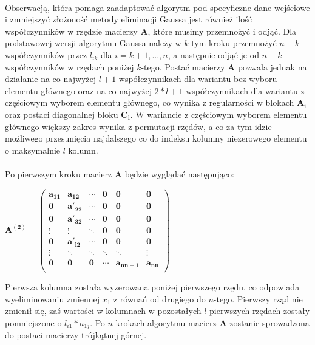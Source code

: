 \documentclass[a4paper]{article}
\begin{document}
\paragraph{}
Obserwacją, która pomaga zaadaptować algorytm pod specyficzne dane wejściowe i zmniejszyć złożoność metody eliminacji Gaussa jest również ilość współczynników w rzędzie macierzy $\mathbf{A}$, które musimy przemnożyć i odjąć. Dla podstawowej wersji algorytmu Gaussa należy w $k$-tym kroku przemnożyć $n - k$ współczynników przez $l_{i k}$ dla $i = k + 1, ..., n$, a następnie odjąć je od $n - k$ współczynników w rzędach poniżej $k$-tego. Postać macierzy $\mathbf{A}$ pozwala jednak na działanie na co najwyżej $l + 1$ współczynnikach dla wariantu bez wyboru elementu głównego oraz na co najwyżej $2*l + 1$ współczynnikach dla wariantu z częściowym wyborem elementu głównego, co wynika z regularności w blokach $\mathbf{A_{i}}$ oraz postaci diagonalnej bloku $\mathbf{C_{i}}$. W wariancie z częściowym wyborem elementu głównego większy zakres wynika z permutacji rzędów, a co za tym idzie możliwego przesunięcia najdalszego co do indeksu kolumny niezerowego elementu o maksymalnie $l$ kolumn.

\paragraph{}
Po pierwszym kroku macierz $\mathbf{A}$ będzie wyglądać następująco:
\begin{center}
$\mathbf{
		A^{(2)} = 
 		\begin{pmatrix}
 		a_{1 1} & a_{1 2} & \cdots & 0 & 0 & 0 \\
 		0 & a'_{2 2} & \cdots & 0 & 0 & 0 \\
 		0 & a'_{3 2} & \cdots & 0 & 0 & 0 \\
 		\vdots & \vdots & \ddots & 0 & 0 & 0 \\
 		0 & a'_{l 2} & \cdots & 0 & 0 & 0 \\
 		\vdots & \ddots & \ddots & \ddots & \ddots & \vdots \\
 		0 & 0 & 0 & \cdots & a_{n n-1} & a_{n n}\\	
 		\end{pmatrix}
 	}$
\end{center}

Pierwsza kolumna została wyzerowana poniżej pierwszego rzędu, co odpowiada wyeliminowaniu zmiennej $x_{1}$ z równań od drugiego do $n$-tego. Pierwszy rząd nie zmienił się, zaś wartości w kolumnach w pozostałych $l$ pierwszych rzędach zostały pomniejszone o $l_{i 1} * a_{1 j}$. Po $n$ krokach algorytmu macierz $\mathbf{A}$ zostanie sprowadzona do postaci macierzy trójkątnej górnej.
\end{document}
